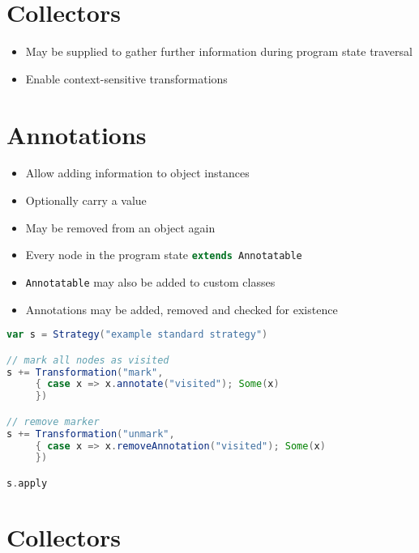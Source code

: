 \documentclass{article}
\begin{document}
\section{Collectors}
\begin{itemize}
 \item May be supplied to gather further information during program state traversal
 \item Enable context-sensitive transformations
\end{itemize}


\section{Annotations}
\begin{itemize}
 \item Allow adding information to object instances
 \item Optionally carry a value
 \item May be removed from an object again
 \item Every node in the program state \lstinline[language=scala]{extends Annotatable}
 \item \lstinline[language=scala]{Annotatable} may also be added to custom classes
 \item Annotations may be added, removed and checked for existence
\end{itemize}


\begin{lstlisting}[language=scala, breaklines=false]
var s = Strategy("example standard strategy")

// mark all nodes as visited
s += Transformation("mark",
     { case x => x.annotate("visited"); Some(x)
     })

// remove marker
s += Transformation("unmark",
     { case x => x.removeAnnotation("visited"); Some(x)
     })

s.apply
\end{lstlisting}



\section{Collectors}
\end{document}
